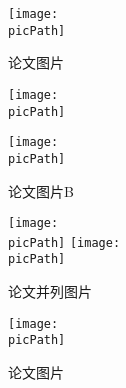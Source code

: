 \documentclass[a4paper, UTF-8,14pt]{ctexart}
\newcommand{\tcap}[1]{
	\caption{\zihao{5}\kaishu #1}
}
\newcommand{\picPath}{sample.jpg}
\begin{document}

\begin{figure}[!htbp]
	\centering
	\texttt{[image: \\picPath]}
	\tcap{论文图片}
	\label{fig:f1}	
\end{figure}

\begin{figure}[!htbp]
	\centering
	\begin{minipage}[b]{.4\linewidth}
		\centering
		\texttt{[image: \\picPath]}
		\tcap{论文图片A}	
	\end{minipage}
	\qquad
	\begin{minipage}[b]{.4\linewidth}
		\centering
		\texttt{[image: \\picPath]}
		\tcap{论文图片B}	
	\end{minipage}
\end{figure}

\begin{figure}[!htbp]
	\centering
	\texttt{[image: \\picPath]}
	\qquad
	\texttt{[image: \\picPath]}
	\tcap{论文并列图片}
\end{figure}

\begin{figure}[!ht]
	\centering
	\texttt{[image: \\picPath]}
	\tcap{论文图片}
	\label{fig:f3}	
\end{figure}
\end{document}
